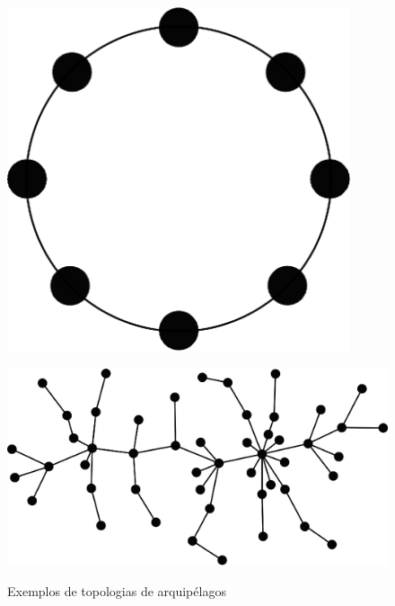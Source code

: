 \begin{figure}[H]
    \centering
    \begin{minipage}{.2\textwidth}
        \includegraphics[width=0.9\textwidth]{figures/ring}
        \label{fig:ring}
    \end{minipage}%
    \quad\quad\quad\quad
    \begin{minipage}{.35\textwidth}
        \includegraphics[width=\textwidth]{figures/barabasi-albert}
        \label{fig:barabasi-albert}
    \end{minipage}

    \caption{Exemplos de topologias de arquipélagos}
\end{figure}

